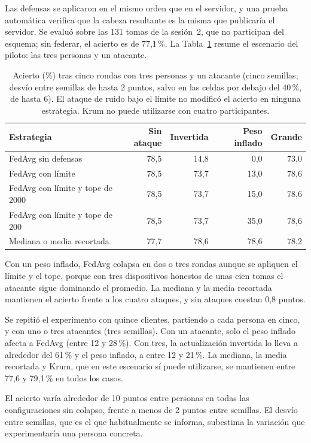 Las defensas se aplicaron en el mismo orden que en el servidor, y una prueba automática verifica que la cabeza resultante es la misma que publicaría el servidor. Se evaluó sobre las 131 tomas de la sesión~2, que no participan del esquema; sin federar, el acierto es de 77,1\,\%. La Tabla~\ref{tab:ataques} resume el escenario del piloto: las tres personas y un atacante.

\begin{table}[h]
    \centering
    \small
    \begin{tabular}{lrrrr}
        \toprule
        Estrategia & Sin ataque & Invertida & Peso inflado & Grande \\
        \midrule
        FedAvg sin defensas & 78,5 & 14,8 & 0,0 & 73,0 \\
        FedAvg con límite & 78,5 & 73,7 & 13,0 & 78,6 \\
        FedAvg con límite y tope de 2000 & 78,5 & 73,7 & 15,0 & 78,6 \\
        FedAvg con límite y tope de 200 & 78,5 & 73,7 & 35,0 & 78,6 \\
        Mediana o media recortada & 77,7 & 78,6 & 78,6 & 78,2 \\
        \bottomrule
    \end{tabular}
    \caption{Acierto (\%) tras cinco rondas con tres personas y un atacante (cinco semillas; desvío entre semillas de hasta 2 puntos, salvo en las celdas por debajo del 40\,\%, de hasta 6). El ataque de ruido bajo el límite no modificó el acierto en ninguna estrategia. Krum no puede utilizarse con cuatro participantes.}
    \label{tab:ataques}
\end{table}

Con un peso inflado, FedAvg colapsa en dos o tres rondas aunque se apliquen el límite y el tope, porque con tres dispositivos honestos de unas cien tomas el atacante sigue dominando el promedio. La mediana y la media recortada mantienen el acierto frente a los cuatro ataques, y sin ataques cuestan 0,8 puntos.

Se repitió el experimento con quince clientes, partiendo a cada persona en cinco, y con uno o tres atacantes (tres semillas). Con un atacante, solo el peso inflado afecta a FedAvg (entre 12 y 28\,\%). Con tres, la actualización invertida lo lleva a alrededor del 61\,\% y el peso inflado, a entre 12 y 21\,\%. La mediana, la media recortada y Krum, que en este escenario sí puede utilizarse, se mantienen entre 77,6 y 79,1\,\% en todos los casos.

El acierto varía alrededor de 10 puntos entre personas en todas las configuraciones sin colapso, frente a menos de 2 puntos entre semillas. El desvío entre semillas, que es el que habitualmente se informa, subestima la variación que experimentaría una persona concreta.

